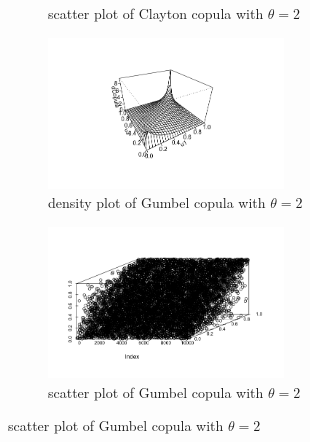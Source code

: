 \documentclass[mstat,12pt]{unswthesis}  %
\numberwithin{equation}{section}
\begin{document}
\begin{figure}[h]
\begin{subfigure}{.5\textwidth}
  \caption{scatter plot of Clayton copula with $\theta=2$}
  \label{fig:sub-forth}
\end{subfigure}
\begin{subfigure}{.5\textwidth}
  \centering
  \includegraphics[width=\linewidth,height=4cm]{gumbeld.png}  
  \caption{density plot of Gumbel copula with $\theta=2$}
  \label{fig:sub-fifth}
\end{subfigure}
\begin{subfigure}{.5\textwidth}
  \centering
  \includegraphics[width=\linewidth,height=4cm]{gumbelr.png}  
  \caption{scatter plot of Gumbel copula with $\theta=2$}
  \label{fig:sub-sixth}
\end{subfigure}

\end{figure}
\end{document}
